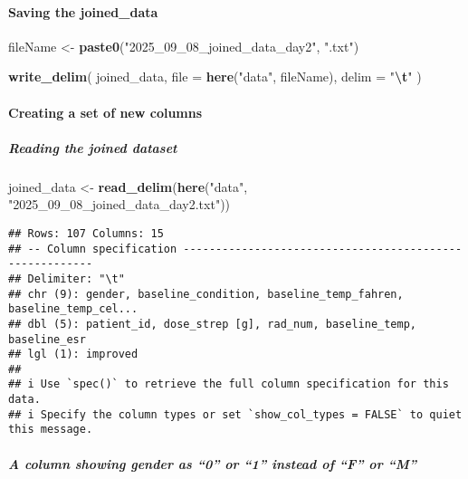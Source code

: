 \documentclass[
]{article}
\newenvironment{Shaded}{\begin{snugshade}}{\end{snugshade}}
\newcommand{\AttributeTok}[1]{\textcolor[rgb]{0.13,0.29,0.53}{#1}}
\newcommand{\FunctionTok}[1]{\textcolor[rgb]{0.13,0.29,0.53}{\textbf{#1}}}
\newcommand{\NormalTok}[1]{#1}
\newcommand{\OtherTok}[1]{\textcolor[rgb]{0.56,0.35,0.01}{#1}}
\newcommand{\SpecialCharTok}[1]{\textcolor[rgb]{0.81,0.36,0.00}{\textbf{#1}}}
\newcommand{\StringTok}[1]{\textcolor[rgb]{0.31,0.60,0.02}{#1}}
\begin{document}
\paragraph{Saving the joined\_data}\label{saving-the-joined_data}

\begin{Shaded}
\begin{Highlighting}[]
\NormalTok{fileName }\OtherTok{\textless{}{-}} \FunctionTok{paste0}\NormalTok{(}\StringTok{"2025\_09\_08\_joined\_data\_day2"}\NormalTok{, }\StringTok{".txt"}\NormalTok{)}

\FunctionTok{write\_delim}\NormalTok{(}
\NormalTok{  joined\_data, }
  \AttributeTok{file =} \FunctionTok{here}\NormalTok{(}\StringTok{"data"}\NormalTok{, fileName),}
  \AttributeTok{delim =} \StringTok{"}\SpecialCharTok{\textbackslash{}t}\StringTok{"}
\NormalTok{)}
\end{Highlighting}
\end{Shaded}

\paragraph{Creating a set of new
columns}\label{creating-a-set-of-new-columns}

\subparagraph{Reading the joined
dataset}\label{reading-the-joined-dataset}

\begin{Shaded}
\begin{Highlighting}[]
\NormalTok{joined\_data }\OtherTok{\textless{}{-}} \FunctionTok{read\_delim}\NormalTok{(}\FunctionTok{here}\NormalTok{(}\StringTok{"data"}\NormalTok{, }\StringTok{"2025\_09\_08\_joined\_data\_day2.txt"}\NormalTok{))}
\end{Highlighting}
\end{Shaded}

\begin{verbatim}
## Rows: 107 Columns: 15
## -- Column specification --------------------------------------------------------
## Delimiter: "\t"
## chr (9): gender, baseline_condition, baseline_temp_fahren, baseline_temp_cel...
## dbl (5): patient_id, dose_strep [g], rad_num, baseline_temp, baseline_esr
## lgl (1): improved
## 
## i Use `spec()` to retrieve the full column specification for this data.
## i Specify the column types or set `show_col_types = FALSE` to quiet this message.
\end{verbatim}

\subparagraph{A column showing gender as ``0'' or ``1'' instead of ``F''
or ``M''}\label{a-column-showing-gender-as-0-or-1-instead-of-f-or-m}
\end{document}
